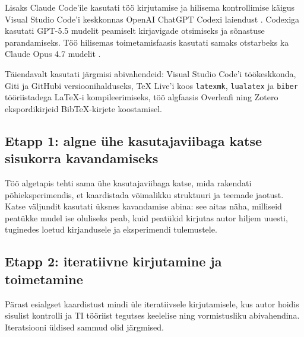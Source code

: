 Lisaks Claude Code'ile kasutati töö kirjutamise ja hilisema kontrollimise käigus Visual Studio Code'i keskkonnas OpenAI ChatGPT Codexi laiendust \cite{openai2025codex}. Codexiga kasutati GPT-5.5 mudelit peamiselt kirjavigade otsimiseks ja sõnastuse parandamiseks. Töö hilisemas toimetamisfaasis kasutati samaks otstarbeks ka Claude Opus 4.7 mudelit \cite{anthropic2026opus47}.

Täiendavalt kasutati järgmisi abivahendeid: Visual Studio Code'i töökeskkonda, Giti ja GitHubi versioonihalduseks, TeX Live'i koos \texttt{latexmk}, \texttt{lualatex} ja \texttt{biber} tööriistadega \LaTeX{}-i kompileerimiseks, töö algfaasis Overleafi ning Zotero ekspordikirjeid BibTeX-kirjete koostamisel.


\subsection{Etapp 1: algne ühe kasutajaviibaga katse sisukorra kavandamiseks} \label{subsec:etapp1}

Töö algetapis tehti sama ühe kasutajaviibaga katse, mida rakendati põhieksperimendis, et kaardistada võimalikku struktuuri ja teemade jaotust. Katse väljundit kasutati üksnes kavandamise abina: see aitas näha, milliseid peatükke mudel ise oluliseks peab, kuid peatükid kirjutas autor hiljem uuesti, tuginedes loetud kirjandusele ja eksperimendi tulemustele.

\subsection{Etapp 2: iteratiivne kirjutamine ja toimetamine} \label{subsec:etapp2}

Pärast esialgset kaardistust mindi üle iteratiivsele kirjutamisele, kus autor hoidis sisulist kontrolli ja TI tööriist tegutses keelelise ning vormistusliku abivahendina. Iteratsiooni üldised sammud olid järgmised.

